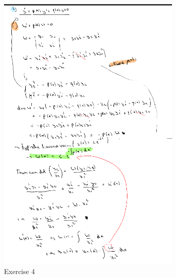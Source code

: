 \documentclass[a4paper]{report}
\begin{document}
\begin{figure}[H]
	\centering
	\includegraphics[width=0.8\textwidth]{assets/exercise_4_huis_8.png}
	\caption{Exercise 4}
	\label{fig:exercise_4_huis_8}
\end{figure}
\end{document}
